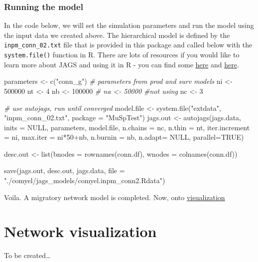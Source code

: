 \documentclass[
]{book}
\newenvironment{Shaded}{\begin{snugshade}}{\end{snugshade}}
\newcommand{\AttributeTok}[1]{\textcolor[rgb]{0.77,0.63,0.00}{#1}}
\newcommand{\CommentTok}[1]{\textcolor[rgb]{0.56,0.35,0.01}{\textit{#1}}}
\newcommand{\ConstantTok}[1]{\textcolor[rgb]{0.00,0.00,0.00}{#1}}
\newcommand{\DecValTok}[1]{\textcolor[rgb]{0.00,0.00,0.81}{#1}}
\newcommand{\FunctionTok}[1]{\textcolor[rgb]{0.00,0.00,0.00}{#1}}
\newcommand{\NormalTok}[1]{#1}
\newcommand{\OtherTok}[1]{\textcolor[rgb]{0.56,0.35,0.01}{#1}}
\newcommand{\SpecialCharTok}[1]{\textcolor[rgb]{0.00,0.00,0.00}{#1}}
\newcommand{\StringTok}[1]{\textcolor[rgb]{0.31,0.60,0.02}{#1}}
\begin{document}
\hypertarget{running-the-model}{%
\subsection{Running the model}\label{running-the-model}}

In the code below, we will set the simulation parameters and run the model using the input data we created above. The hierarchical model is defined by the \texttt{inpm\_conn\_02.txt} file that is provided in this package and called below with the \texttt{system.file()} function in R. There are lots of resources if you would like to learn more about JAGS and using it in R - you can find some \href{https://bookdown.org/steve_midway/BHME/Ch4.html}{here} and \href{https://rstudio-pubs-static.s3.amazonaws.com/272658_ae4d482c86514674be17042c852ebbfc.html}{here}.

\begin{Shaded}
\begin{Highlighting}[]
\NormalTok{parameters }\OtherTok{\textless{}{-}} \FunctionTok{c}\NormalTok{(}\StringTok{"conn\_g"}\NormalTok{)}
\CommentTok{\# parameters from prod and surv models}
\NormalTok{ ni }\OtherTok{\textless{}{-}} \DecValTok{500000}
\NormalTok{ nt }\OtherTok{\textless{}{-}} \DecValTok{4}
\NormalTok{ nb }\OtherTok{\textless{}{-}} \DecValTok{100000}
\CommentTok{\# na \textless{}{-} 50000  \#not using}
\NormalTok{ nc }\OtherTok{\textless{}{-}} \DecValTok{3}

\CommentTok{\# use autojags, run until converged}
\NormalTok{model.file }\OtherTok{\textless{}{-}} \FunctionTok{system.file}\NormalTok{(}\StringTok{"extdata"}\NormalTok{, }\StringTok{"inpm\_conn\_02.txt"}\NormalTok{, }\AttributeTok{package =} \StringTok{"MuSpTest"}\NormalTok{)}
\NormalTok{jags.out }\OtherTok{\textless{}{-}} \FunctionTok{autojags}\NormalTok{(jags.data, }\AttributeTok{inits =} \ConstantTok{NULL}\NormalTok{, parameters, model.file,  }
                 \AttributeTok{n.chains =}\NormalTok{ nc, }\AttributeTok{n.thin =}\NormalTok{ nt, }\AttributeTok{iter.increment =}\NormalTok{ ni,}
                 \AttributeTok{max.iter =}\NormalTok{ ni}\SpecialCharTok{*}\DecValTok{50}\SpecialCharTok{+}\NormalTok{nb, }\AttributeTok{n.burnin =}\NormalTok{ nb,  }
                 \AttributeTok{n.adapt=} \ConstantTok{NULL}\NormalTok{, }\AttributeTok{parallel=}\ConstantTok{TRUE}\NormalTok{)}

\NormalTok{desc.out }\OtherTok{\textless{}{-}} \FunctionTok{list}\NormalTok{(}\AttributeTok{bnodes =} \FunctionTok{rownames}\NormalTok{(conn.df),}
               \AttributeTok{wnodes =} \FunctionTok{colnames}\NormalTok{(conn.df))}

\FunctionTok{save}\NormalTok{(jags.out, desc.out, jags.data, }
     \AttributeTok{file =} \StringTok{"./comyel/jags\_models/comyel.inpm\_conn2.Rdata"}\NormalTok{)}
\end{Highlighting}
\end{Shaded}

Voila. A migratory network model is completed. Now, onto \protect\hyperlink{visualization}{visualization}

\hypertarget{visualization}{%
\chapter{Network visualization}\label{visualization}}

To be created\ldots{}

  
\end{document}
